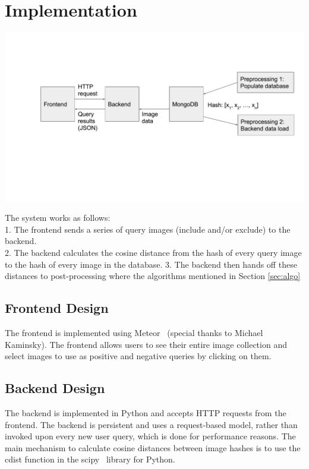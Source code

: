 \section{Implementation}
\begin{minipage}{1.0\columnwidth}
    \centering
    \includegraphics[width=0.9\columnwidth]{figs/system-design}
    \label{system-design}
\end{minipage}
The system works as follows:\\
    1. The frontend sends a series of query images (include and/or exclude) to the backend. \\
    2. The backend calculates the cosine distance from the hash of every query image to the hash of every image in the database.
    3. The backend then hands off these distances to post-processing where the algorithms mentioned in Section \ref{sec:algo}

\subsection{Frontend Design}
The frontend is implemented using Meteor~\cite{coleman2015discover} (special thanks to Michael Kaminsky).
The frontend allows users to see their entire image collection and select images to use as positive
and negative queries by clicking on them.

\subsection{Backend Design}
The backend is implemented in Python and accepts HTTP requests from the frontend.
The backend is persistent and uses a request-based model, rather than invoked upon every new user query,
which is done for performance reasons.
The main mechanism to calculate cosine distances between image hashes is to use the cdist function in the
scipy~\cite{jones2001open} library for Python.

